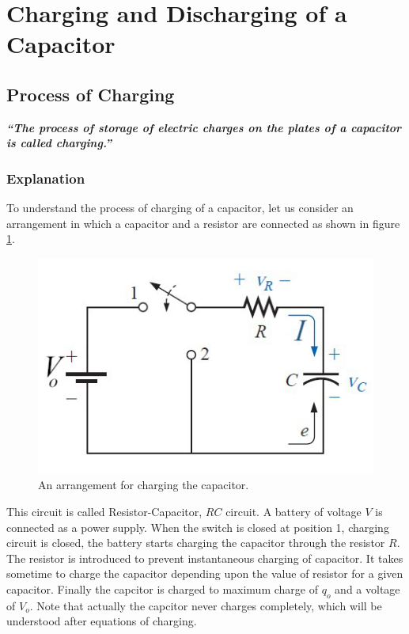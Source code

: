 \section{Charging and Discharging of a Capacitor}
\subsection{Process of Charging}
\textit{\textbf{
  “The process of storage of electric
  charges  on the plates of a capacitor is called charging.”
}}
\subsubsection{Explanation}
To understand the process of charging of a capacitor,
let us consider an arrangement
in which a capacitor and a resistor are connected as shown in
figure \ref{fig:11.36}.
\begin{figure}[H]
  \centering
  \includegraphics[scale = 0.5]{Images/Chapter-11/11.36}
  \caption{An arrangement for charging the capacitor.}
  \label{fig:11.36}
\end{figure}
This circuit is called Resistor-Capacitor, $RC$ circuit.
A battery of voltage $V$ is connected as a power supply.
When the switch is closed at position 1, charging circuit is closed,
the battery starts charging the capacitor through the resistor $R$.
The resistor is introduced to prevent instantaneous charging of capacitor.
It takes sometime to charge the capacitor depending upon the value of
resistor for a given capacitor. Finally the capcitor is charged
to maximum charge of $q_{o}$ and a voltage of $V_{o}$.
Note that actually the capcitor never
charges completely, which will be understood after equations of charging.
